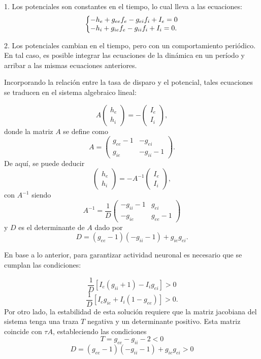\documentclass[aps,prb,twocolumn,superscriptaddress,floatfix,longbibliography]{revtex4-2}
\newcounter{para}
\begin{document}
1. Los potenciales son constantes en el tiempo, lo cual lleva a las ecuaciones:
\[
\left\{\begin{array}{@{}l@{}}
    -h_e + g_{ee} f_e - g_{ei} f_i + I_e = 0 \\
    -h_i + g_{ie} f_e - g_{ii} f_i + I_i = 0.
    \end{array}\right.
\]
    
2. Los potenciales cambian en el tiempo, pero con un comportamiento periódico. En tal caso, es posible integrar las ecuaciones de la dinámica en un período y arribar a las mismas ecuaciones anteriores.

Incorporando la relación entre la tasa de disparo y el potencial, tales ecuaciones se traducen en el sistema algebraico lineal:

\[ A \begin{pmatrix} h_e \\ h_i \end{pmatrix} = - \begin{pmatrix} I_e \\ I_i \end{pmatrix}, \]
donde la matriz \(A\) se define como
\[ A = \begin{pmatrix} g_{ee} - 1 & -g_{ei} \\ g_{ie} & -g_{ii} - 1 \end{pmatrix}. \]
De aquí, se puede deducir
\[ \begin{pmatrix} h_e \\ h_i \end{pmatrix} = - A^{-1} \begin{pmatrix} I_e \\ I_i \end{pmatrix}, \]
con \(A^{-1}\) siendo
\[ A^{-1} = \frac{1}{D} \begin{pmatrix} -g_{ii} - 1 & g_{ei} \\ -g_{ie} & g_{ee} - 1 \end{pmatrix} \]
y \(D\) es el determinante de \(A\) dado por
\[D = (g_{ee} - 1)(-g_{ii} - 1) + g_{ie}g_{ei}.\]

En base a lo anterior, para garantizar actividad neuronal es necesario que se cumplan las condiciones:

\[ \frac{1}{D} [ I_e (g_{ii} + 1) - I_i g_{ei} ] > 0 \]
\[ \frac{1}{D} [ I_e g_{ie} + I_i (1 - g_{ee}) ] > 0. \]
Por otro lado, la estabilidad de esta solución requiere que la matriz jacobiana del sistema tenga una traza \(T\) negativa y un determinante positivo. Esta matriz coincide con \(\tau A\), estableciendo las condiciones
\[ T = g_{ee} -g_{ii} - 2 < 0 \]
\[ D = (g_{ee} - 1)(-g_{ii} - 1) + g_{ie}g_{ei} > 0 \]
\end{document}
